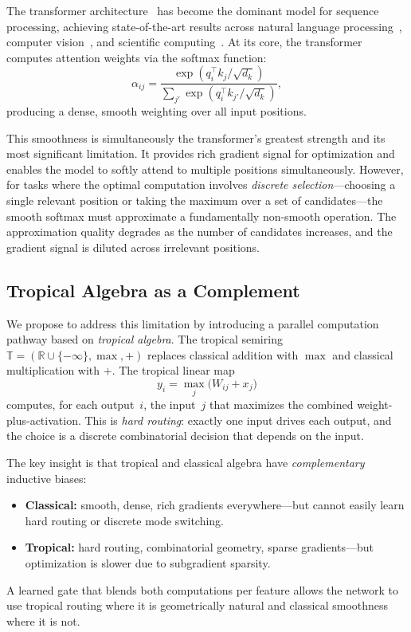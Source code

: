 \documentclass[11pt,twocolumn]{article}
\newcommand{\R}{\mathbb{R}}
\newcommand{\T}{\mathbb{T}}
\begin{document}
The transformer architecture~\cite{vaswani2017attention} has become the
dominant model for sequence processing, achieving state-of-the-art results
across natural language processing~\cite{devlin2019bert,brown2020language},
computer vision~\cite{dosovitskiy2021image}, and scientific
computing~\cite{jumper2021alphafold}. At its core, the transformer computes
attention weights via the softmax function:
\begin{equation}\label{eq:classical-attn}
  \alpha_{ij} = \frac{\exp(q_i^\top k_j / \sqrt{d_k})}
                     {\sum_{j'} \exp(q_i^\top k_{j'} / \sqrt{d_k})},
\end{equation}
producing a dense, smooth weighting over all input positions.

This smoothness is simultaneously the transformer's greatest strength and its
most significant limitation. It provides rich gradient signal for optimization
and enables the model to softly attend to multiple positions simultaneously.
However, for tasks where the optimal computation involves \emph{discrete
selection}---choosing a single relevant position or taking the maximum over a
set of candidates---the smooth softmax must approximate a fundamentally
non-smooth operation. The approximation quality degrades as the number of
candidates increases, and the gradient signal is diluted across irrelevant
positions.

\subsection{Tropical Algebra as a Complement}

We propose to address this limitation by introducing a parallel computation
pathway based on \emph{tropical algebra}. The tropical semiring
$\T = (\R \cup \{-\infty\}, \max, +)$ replaces classical addition with $\max$
and classical multiplication with $+$. The tropical linear map
\begin{equation}\label{eq:trop-linear}
  y_i = \max_j\bigl(W_{ij} + x_j\bigr)
\end{equation}
computes, for each output~$i$, the input~$j$ that maximizes the combined
weight-plus-activation. This is \emph{hard routing}: exactly one input drives
each output, and the choice is a discrete combinatorial decision that depends
on the input.

The key insight is that tropical and classical algebra have
\emph{complementary} inductive biases:
\begin{itemize}[nosep]
  \item \textbf{Classical:} smooth, dense, rich gradients everywhere---but
    cannot easily learn hard routing or discrete mode switching.
  \item \textbf{Tropical:} hard routing, combinatorial geometry, sparse
    gradients---but optimization is slower due to subgradient sparsity.
\end{itemize}
A learned gate that blends both computations per feature allows the network
to use tropical routing where it is geometrically natural and classical
smoothness where it is not.
\end{document}
